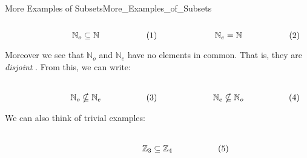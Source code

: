 \begin{lexample}{More Examples of Subsets}{More_Examples_of_Subsets}
\begin{subequations}
\begin{minipage}[b]{0.49\textwidth}
\begin{equation}
                        \mathbb{N}_{o}\subseteq\mathbb{N}
                    \end{equation}
                \end{minipage}
                \hfill
                \begin{minipage}[b]{0.49\textwidth}
                    \centering
                    \begin{equation}
                        \mathbb{N}_{e}=\mathbb{N}
                    \end{equation}
                \end{minipage}
            \end{subequations}
            \par\vspace{2.5ex}
            Moreover we see that $\mathbb{N}_{o}$ and $\mathbb{N}_{e}$ have no
            elements in common. That is, they are \textit{disjoint}%
            . From this, we can write:
            \par
            \begin{subequations}
                \begin{minipage}[b]{0.49\textwidth}
                    \centering
                    \begin{equation}
                        \mathbb{N}_{o}\nsubseteq\mathbb{N}_{e}
                    \end{equation}
                \end{minipage}
                \hfill
                \begin{minipage}[b]{0.49\textwidth}
                    \centering
                    \begin{equation}
                        \mathbb{N}_{e}\nsubseteq\mathbb{N}_{o}
                    \end{equation}
                \end{minipage}
            \end{subequations}
            \par\vspace{2.5ex}
            We can also think of trivial examples:
            \par
            \begin{subequations}
                \begin{minipage}[b]{0.49\textwidth}
                    \centering
                    \begin{equation}
                        \mathbb{Z}_{3}\subseteq\mathbb{Z}_{4}

\end{equation}
\end{minipage}
\end{subequations}
\end{lexample}
